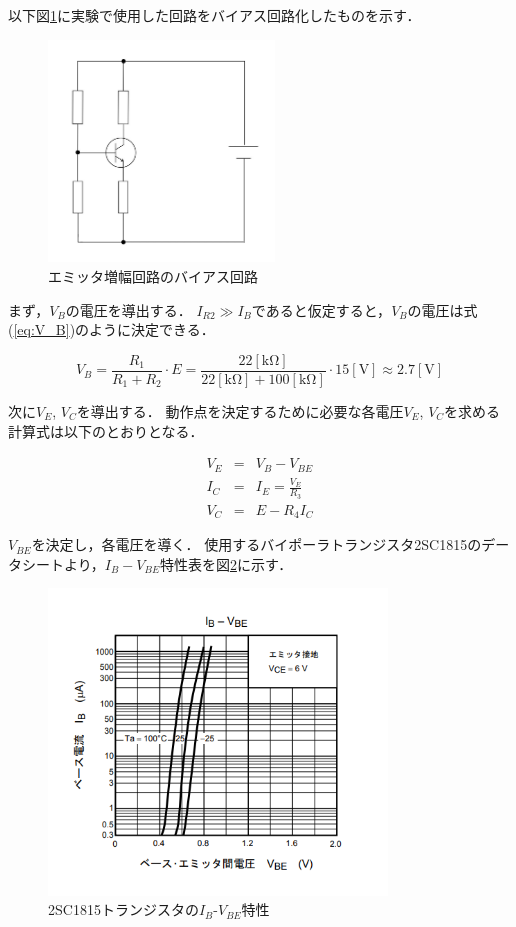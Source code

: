 \documentclass[dvipdfmx,titlepage,a4j]{jsarticle}  %
\numberwithin{equation}{section}
\begin{document}
以下図\ref{fig:fig2-bias.jpg}に実験で使用した回路をバイアス回路化したものを示す．
\begin{figure}[H]
  \centering
  \includegraphics[width=6cm]{../fig/fig2-bias.jpg}
  \caption{エミッタ増幅回路のバイアス回路}
  \label{fig:fig2-bias.jpg}
\end{figure}

まず，$V_B$の電圧を導出する．
$I_{R2} \gg  I_B$であると仮定すると，$V_B$の電圧は式(\ref{eq:V_B})のように決定できる．

\begin{equation}
  V_B = \frac{R_1}{R_1 + R_2} \cdot E = \frac{22 \mathrm{[k\Omega]}}{22 \mathrm{[k\Omega]} + 100 \mathrm{[k\Omega]}} \cdot 15 \mathrm{[V]} \approx  2.7 \mathrm{[V]}
  \label{eq:V_B}
\end{equation}

次に$V_{E}$, $V_{C}$を導出する．
動作点を決定するために必要な各電圧$V_{E}$, $V_{C}$を求める計算式は以下のとおりとなる．

\begin{eqnarray}
  V_E &=& V_B - V_{BE} \\
  I_C &=& I_E = \frac{V_E}{R_3} \\
  V_C &=& E - R_4 I_C
\end{eqnarray}

$V_{BE}$を決定し，各電圧を導く．
使用するバイポーラトランジスタ2SC1815のデータシートより，$I_B - V_{BE}$特性表を図\ref{fig:ibvbe.png}に示す．
\begin{figure}[H]
  \centering
  \includegraphics[width=9cm]{../2sc1815/ibvbe.png}
  \caption{2SC1815トランジスタの$I_B$-$V_{BE}$特性}
  \label{fig:ibvbe.png}
\end{figure}
\end{document}
